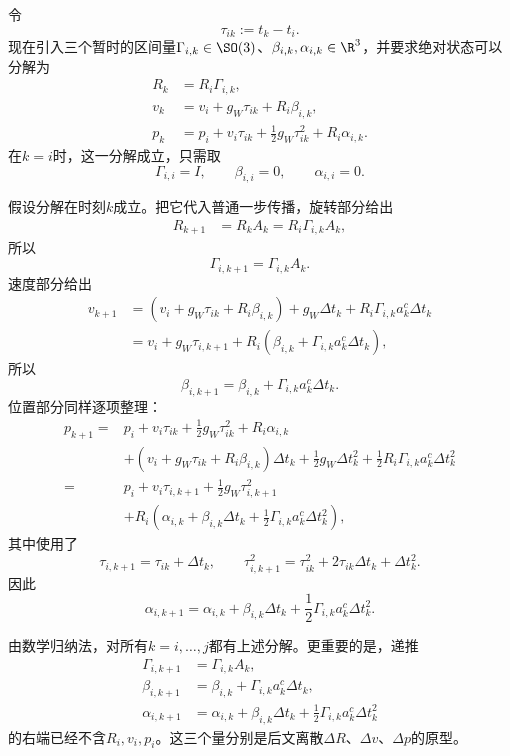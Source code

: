 令
\[
    \tau_{ik}:=t_k-t_i.
\]
现在引入三个暂时的区间量$\Gamma_{i,k}\in\SO(3)$、$\beta_{i,k},\alpha_{i,k}\in\R^3$，并要求绝对状态可以分解为
\[
\boxed{
\begin{aligned}
    R_k&=R_i\Gamma_{i,k},\\
    v_k&=v_i+g_W\tau_{ik}+R_i\beta_{i,k},\\
    p_k&=p_i+v_i\tau_{ik}
      +\frac12g_W\tau_{ik}^2+R_i\alpha_{i,k}.
\end{aligned}
}
\]
在$k=i$时，这一分解成立，只需取
\[
    \Gamma_{i,i}=I,
    \qquad
    \beta_{i,i}=0,
    \qquad
    \alpha_{i,i}=0.
\]

假设分解在时刻$k$成立。把它代入普通一步传播，旋转部分给出
\[
\begin{aligned}
    R_{k+1}
    &=R_kA_k
     =R_i\Gamma_{i,k}A_k,
\end{aligned}
\]
所以
\[
    \Gamma_{i,k+1}=\Gamma_{i,k}A_k.
\]
速度部分给出
\[
\begin{aligned}
    v_{k+1}
    &=(v_i+g_W\tau_{ik}+R_i\beta_{i,k})
      +g_W\Delta t_k
      +R_i\Gamma_{i,k}a_k^c\Delta t_k\\
    &=v_i+g_W\tau_{i,k+1}
      +R_i\left(
        \beta_{i,k}+\Gamma_{i,k}a_k^c\Delta t_k
      \right),
\end{aligned}
\]
所以
\[
    \beta_{i,k+1}
    =\beta_{i,k}+\Gamma_{i,k}a_k^c\Delta t_k.
\]
位置部分同样逐项整理：
\[
\begin{aligned}
    p_{k+1}
    ={}&p_i+v_i\tau_{ik}
      +\frac12g_W\tau_{ik}^2+R_i\alpha_{i,k}\\
      &+(v_i+g_W\tau_{ik}+R_i\beta_{i,k})\Delta t_k
      +\frac12g_W\Delta t_k^2
      +\frac12R_i\Gamma_{i,k}a_k^c\Delta t_k^2\\
    ={}&p_i+v_i\tau_{i,k+1}
      +\frac12g_W\tau_{i,k+1}^2\\
      &+R_i\left(
        \alpha_{i,k}+\beta_{i,k}\Delta t_k
        +\frac12\Gamma_{i,k}a_k^c\Delta t_k^2
      \right),
\end{aligned}
\]
其中使用了
\[
    \tau_{i,k+1}=\tau_{ik}+\Delta t_k,
    \qquad
    \tau_{i,k+1}^2
    =\tau_{ik}^2+2\tau_{ik}\Delta t_k+\Delta t_k^2.
\]
因此
\[
    \alpha_{i,k+1}
    =\alpha_{i,k}+\beta_{i,k}\Delta t_k
      +\frac12\Gamma_{i,k}a_k^c\Delta t_k^2.
\]

由数学归纳法，对所有$k=i,\ldots,j$都有上述分解。更重要的是，递推
\[
\boxed{
\begin{aligned}
    \Gamma_{i,k+1}
    &=\Gamma_{i,k}A_k,\\
    \beta_{i,k+1}
    &=\beta_{i,k}+\Gamma_{i,k}a_k^c\Delta t_k,\\
    \alpha_{i,k+1}
    &=\alpha_{i,k}+\beta_{i,k}\Delta t_k
      +\frac12\Gamma_{i,k}a_k^c\Delta t_k^2
\end{aligned}
}
\]
的右端已经不含$R_i,v_i,p_i$。这三个量分别是后文离散$\Delta R$、$\Delta v$、$\Delta p$的原型。

